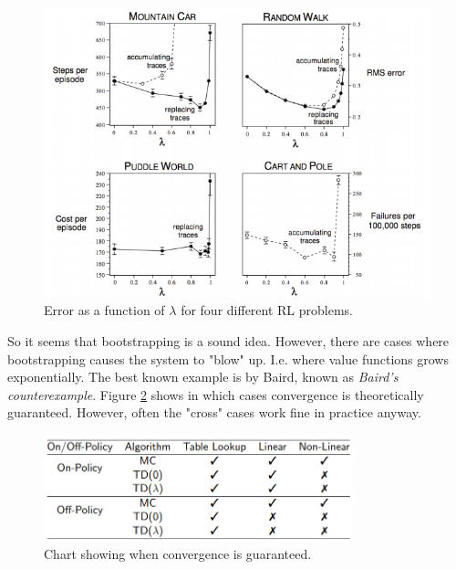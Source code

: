 \documentclass[12pt, a4paper]{article}
\numberwithin{equation}{section}
\begin{document}
\begin{figure}
\centering
\includegraphics[width=\textwidth]{bootstrap_or_not}
\caption{Error as a function of $\lambda$ for four different RL problems.}
\label{fig:bootstrap_or_not}
\end{figure}

So it seems that bootstrapping is a sound idea. However, there are cases where bootstrapping causes the system to "blow" up. I.e. where value functions grows exponentially. The best known example is by Baird, known as \textit{Baird's counterexample}. Figure \ref{fig:convergence} shows in which cases convergence is theoretically guaranteed. However, often the "cross" cases work fine in practice anyway.

\begin{figure}
\centering
\includegraphics[width=0.8\textwidth]{convergence}
\caption{Chart showing when convergence is guaranteed.}
\label{fig:convergence}
\end{figure}
\end{document}
